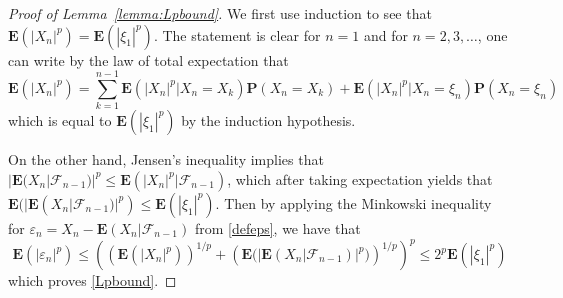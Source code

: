 \documentclass[12pt,a4paper]{article}
\renewcommand{\P}{\mathbf P}
\newcommand{\E}{\mathbf E}
\newcommand{\F}{\mathcal F}
\numberwithin{equation}{section}
\begin{document}
\begin{proof}[Proof of Lemma~\ref{lemma:Lpbound}]
We first use induction to see that $\E(|X_n|^p)=\E(|\xi_1|^p)$.
The statement is clear for $n=1$ and for $n=2,3,\dots$, one can write by the law of total expectation that
\begin{equation}
\E(|X_n|^p)=\sum_{k=1}^{n-1}\E\left(|X_n|^p \big| X_n=X_k\right)\P(X_n=X_k)+\E\left(|X_n|^p\big|X_n=\xi_n\right)\P(X_n=\xi_n)
\end{equation}
which is equal to $\E(|\xi_1|^p)$ by the induction hypothesis.

On the other hand, Jensen's inequality implies that $|\E(X_n|\F_{n-1})|^p\le\E(|X_n|^p|\F_{n-1})$,
which after taking expectation yields that $\E(|\E(X_n|\F_{n-1})|^p)\le\E(|\xi_1|^p)$.
Then by applying the Minkowski inequality for $\varepsilon_n=X_n-\E(X_n|\F_{n-1})$ from \eqref{defeps}, we have that
\begin{equation}
\E(|\varepsilon_n|^p)\le\left(\left(\E\left(|X_n|^p\right)\right)^{1/p}+\left(\E\big(|\E\left(X_n|\F_{n-1}\right)|^p\big)\right)^{1/p}\right)^p
\le2^p\E(|\xi_1|^p)
\end{equation}
which proves \eqref{Lpbound}.
\end{proof}
\end{document}
